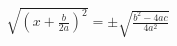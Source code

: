 \documentclass[preview]{standalone}
\begin{document}
\begin{align*}
\sqrt{(x +\frac{b}{2a})^2} = \pm \sqrt{\frac{b^2 -4ac}{4a^2}}
\end{align*}
\end{document}
